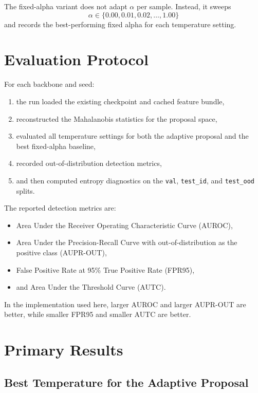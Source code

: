 \documentclass[11pt]{article}
\begin{document}
The fixed-alpha variant does not adapt $\alpha$ per sample. Instead, it sweeps
\[
\alpha \in \{0.00, 0.01, 0.02, \ldots, 1.00\}
\]
and records the best-performing fixed alpha for each temperature setting.

\section{Evaluation Protocol}

For each backbone and seed:
\begin{enumerate}
  \item the run loaded the existing checkpoint and cached feature bundle,
  \item reconstructed the Mahalanobis statistics for the proposal space,
  \item evaluated all temperature settings for both the adaptive proposal and the best fixed-alpha baseline,
  \item recorded out-of-distribution detection metrics,
  \item and then computed entropy diagnostics on the \texttt{val}, \texttt{test\_id}, and \texttt{test\_ood} splits.
\end{enumerate}

The reported detection metrics are:
\begin{itemize}
  \item Area Under the Receiver Operating Characteristic Curve (AUROC),
  \item Area Under the Precision-Recall Curve with out-of-distribution as the positive class (AUPR-OUT),
  \item False Positive Rate at 95\% True Positive Rate (FPR95),
  \item and Area Under the Threshold Curve (AUTC).
\end{itemize}

In the implementation used here, larger AUROC and larger AUPR-OUT are better, while smaller FPR95 and smaller AUTC are better.

\section{Primary Results}

\subsection{Best Temperature for the Adaptive Proposal}
\end{document}
